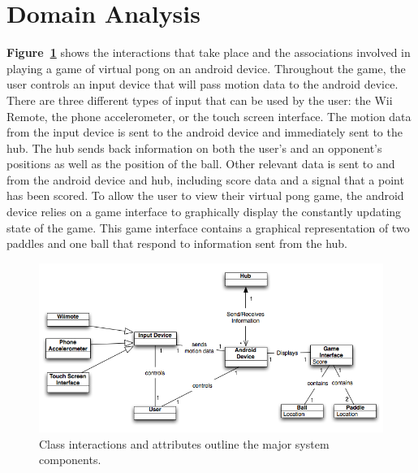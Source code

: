 \documentclass[12pt]{article}
\begin{document}
\section{Domain Analysis}
\textbf{Figure~\ref{domainModel}} shows the interactions that take place and the associations involved in playing a game of virtual pong on an android device.  Throughout the game, the user controls an input device that will pass motion data to the android device.  There are three different types of input that can be used by the user: the Wii Remote, the phone accelerometer, or the touch screen interface.  The motion data from the input device is sent to the android device and immediately sent to the hub.  The hub sends back information on both the user's and an opponent's positions as well as the position of the ball.  Other relevant data is sent to and from the android device and hub, including score data and a signal that a point has been scored.  To allow the user to view their virtual pong game, the android device relies on a game interface to graphically display the constantly updating state of the game.  This game interface contains a graphical representation of two paddles and one ball that respond to information sent from the hub.
\begin{figure}
\begin{center}
\includegraphics[scale=.7]{domainModel_Android-1.png}
\caption{\label{domainModel}Class interactions and attributes outline the major system components.}
\end{center}
\end{figure}
\end{document}
